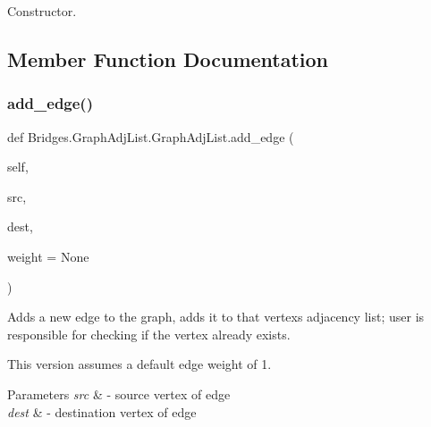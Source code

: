 Constructor. 



\subsection{Member Function Documentation}
\mbox{\label{class_bridges_1_1_graph_adj_list_1_1_graph_adj_list_a34468778a7dade4ed5a826847352f52d}} 
\subsubsection{\texorpdfstring{add\+\_\+edge()}{add\_edge()}}
{\footnotesize\ttfamily def Bridges.\+Graph\+Adj\+List.\+Graph\+Adj\+List.\+add\+\_\+edge (\begin{DoxyParamCaption}\item[{}]{self,  }\item[{}]{src,  }\item[{}]{dest,  }\item[{}]{weight = {\ttfamily None} }\end{DoxyParamCaption})}



Adds a new edge to the graph, adds it to that vertex\textquotesingle{}s adjacency list; user is responsible for checking if the vertex already exists. 

This version assumes a default edge weight of 1.


\begin{DoxyParams}{Parameters}
{\em src} & -\/ source vertex of edge \\
\hline
{\em dest} & -\/ destination vertex of edge \\
\hline
\end{DoxyParams}
\mbox{\label{class_bridges_1_1_graph_adj_list_1_1_graph_adj_list_adcbfcd7291f131383fdb3fca05dd0b59}} 
